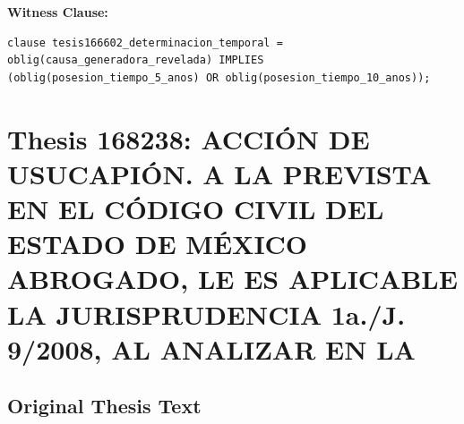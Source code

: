 \documentclass[11pt,a4paper]{article}
\begin{document}
\textbf{Witness Clause:}

\begin{lstlisting}[style=witnessstyle, language=Witness]
clause tesis166602_determinacion_temporal = oblig(causa_generadora_revelada) IMPLIES (oblig(posesion_tiempo_5_anos) OR oblig(posesion_tiempo_10_anos));
\end{lstlisting}

\newpage

\section{Thesis 168238: ACCIÓN DE USUCAPIÓN. A LA PREVISTA EN EL CÓDIGO CIVIL DEL ESTADO DE MÉXICO ABROGADO, LE ES APLICABLE LA JURISPRUDENCIA 1a./J. 9/2008, AL ANALIZAR EN LA}
\label{thesis:168238}

\subsection{Original Thesis Text}
\end{document}
